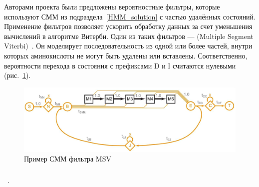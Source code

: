 Авторами проекта были предложены вероятностные фильтры, которые используют СММ 
из подраздела~\ref{HMM_solution} с частью удалённых состояний.
Применение фильтров позволяет ускорить обработку данных за счет уменьшения
вычислений в алгоритме Витерби.
Один из таких фильтров ---  (Multiple Segment 
Viterbi)~\cite{MSV_Eddy}.
Он моделирует последовательность из одной или более частей, внутри которых
аминокислоты не могут быть удалены или вставлены.
Соответственно, вероятности перехода в состояния с префиксами D и I считаются 
нулевыми (рис.~\ref{MSV_example}).
\begin{figure}
  \centering
  \includegraphics[width=\columnwidth]{MSV.png}
  \caption{Пример СММ фильтра MSV~\cite{MSV_Eddy}}
  \label{MSV_example}
\end{figure}

\subsubsection{}
~\cite{cudampf}.
